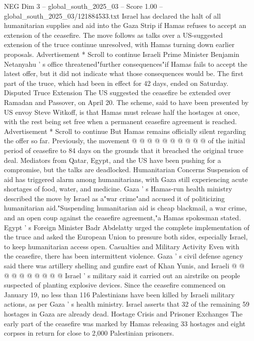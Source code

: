 \begin{textsample}{NEG Dim 3 – global\_south\_2025\_03 – Score 1.00 – global\_south\_2025\_03/121884533.txt}  \label{ex:f3_neg_427}
Israel has declared the halt of all humanitarian supplies and aid into the Gaza Strip if Hamas refuses to accept an extension of the ceasefire.
The move follows as talks over a US-suggested extension of the truce continue unresolved, with Hamas turning down earlier proposals.
Advertisement * Scroll to continue Israeli Prime Minister Benjamin Netanyahu ' s office threatened"further consequences"if Hamas fails to accept the latest offer, but it did not indicate what those consequences would be.
The first part of the truce, which had been in effect for 42 days, ended on Saturday.
Disputed Truce Extension The US suggested the ceasefire be extended over Ramadan and Passover, on April 20.
The scheme, said to have been presented by US envoy Steve Witkoff, is that Hamas must release half the hostages at once, with the rest being set free when a permanent ceasefire agreement is reached.
Advertisement * Scroll to continue But Hamas remains officially silent regarding the offer so far.
Previously, the movement @ @ @ @ @ @ @ @ @ @ of the initial period of ceasefire to 84 days on the grounds that it breached the original truce deal.
Mediators from Qatar, Egypt, and the US have been pushing for a compromise, but the talks are deadlocked.
Humanitarian Concerns Suspension of aid has triggered alarm among humanitarians, with Gaza still experiencing acute shortages of food, water, and medicine.
Gaza ' s Hamas-run health ministry described the move by Israel as a"war crime"and accused it of politicizing humanitarian aid."Suspending humanitarian aid is cheap blackmail, a war crime, and an open coup against the ceasefire agreement,"a Hamas spokesman stated.
Egypt ' s Foreign Minister Badr Abdelatty urged the complete implementation of the truce and asked the European Union to pressure both sides, especially Israel, to keep humanitarian access open.
Casualties and Military Activity Even with the ceasefire, there has been intermittent violence.
Gaza ' s civil defense agency said there was artillery shelling and gunfire east of Khan Yunis, and Israeli @ @ @ @ @ @ @ @ @ @ Israel ' s military said it carried out an airstrike on people suspected of planting explosive devices.
Since the ceasefire commenced on January 19, no less than 116 Palestinians have been killed by Israeli military actions, as per Gaza ' s health ministry.
Israel asserts that 32 of the remaining 59 hostages in Gaza are already dead.
Hostage Crisis and Prisoner Exchanges The early part of the ceasefire was marked by Hamas releasing 33 hostages and eight corpses in return for close to 2,000 Palestinian prisoners.

\end{textsample}
